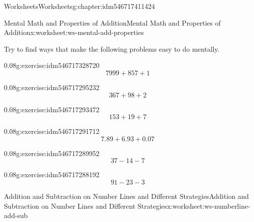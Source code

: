 \documentclass[twoside,11pt,]{book}
\begin{document}
\begin{chapterptx}{Worksheets}{}{Worksheets}{}{}{g:chapter:idm546717411424}
\begin{worksheet-section-numberless}{Mental Math and Properties of Addition}{}{Mental Math and Properties of Addition}{}{}{x:worksheet:ws-mental-add-properties}
\begin{introduction}{}
Try to find ways that make the following problems easy to do mentally.%
\end{introduction}%
\begin{divisionexercise}{1}{}{0.08}{g:exercise:idm546717328720}%
%
\begin{equation*}
7999+857+1
\end{equation*}
%
\end{divisionexercise}%
\begin{divisionexercise}{2}{}{0.08}{g:exercise:idm546717295232}%
%
\begin{equation*}
367+98+2
\end{equation*}
%
\end{divisionexercise}%
\begin{divisionexercise}{3}{}{0.08}{g:exercise:idm546717293472}%
%
\begin{equation*}
153+19+7
\end{equation*}
%
\end{divisionexercise}%
\begin{divisionexercise}{4}{}{0.08}{g:exercise:idm546717291712}%
%
\begin{equation*}
7.89+6.93+0.07
\end{equation*}
%
\end{divisionexercise}%
\begin{divisionexercise}{5}{}{0.08}{g:exercise:idm546717289952}%
%
\begin{equation*}
37-14-7
\end{equation*}
%
\end{divisionexercise}%
\begin{divisionexercise}{6}{}{0.08}{g:exercise:idm546717288192}%
%
\begin{equation*}
91-23-3
\end{equation*}
%
\end{divisionexercise}%
\end{worksheet-section-numberless}
\restoregeometry
%
%
\typeout{************************************************}
\typeout{************************************************}
%
\begin{worksheet-section-numberless}{Addition and Subtraction on Number Lines and Different Strategies}{}{Addition and Subtraction on Number Lines and Different Strategies}{}{}{x:worksheet:ws-numberline-add-sub}
\begin{introduction}{}%

\end{introduction}
\end{worksheet-section-numberless}
\end{chapterptx}
\end{document}
